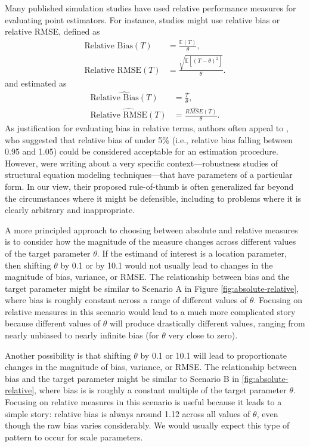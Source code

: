 \documentclass[
]{book}
\newcommand{\E}{\mathbb{E}}
\newcommand{\Bias}{\text{Bias}}
\newcommand{\RMSE}{\text{RMSE}}
\begin{document}
Many published simulation studies have used relative performance measures for evaluating point estimators. For instance, studies might use relative bias or relative RMSE, defined as
\[
\begin{aligned}
\text{Relative }\Bias(T) &= \frac{\E(T)}{\theta}, \\ 
\text{Relative }\RMSE(T) &= \frac{\sqrt{\E\left[\left(T - \theta\right)^2 \right]}}{\theta}.
\end{aligned}
\label{eq:relative-bias-RMSE}
\]
and estimated as
\[
\begin{aligned}
\widehat{\text{Relative }\Bias(T)} &= \frac{\bar{T}}{\theta}, \\ 
\widehat{\text{Relative }\RMSE(T)} &= \frac{\widehat{RMSE}(T)}{\theta}.
\end{aligned}
\label{eq:relative-bias-RMSE-estimators}
\]
As justification for evaluating bias in relative terms, authors often appeal to \citet{hoogland1998RobustnessStudiesCovariance}, who suggested that relative bias of under 5\% (i.e., relative bias falling between 0.95 and 1.05) could be considered acceptable for an estimation procedure.
However, \citet{hoogland1998RobustnessStudiesCovariance} were writing about a very specific context---robustness studies of structural equation modeling techniques---that have parameters of a particular form.
In our view, their proposed rule-of-thumb is often generalized far beyond the circumstances where it might be defensible, including to problems where it is clearly arbitrary and inappropriate.

A more principled approach to choosing between absolute and relative measures is to consider how the magnitude of the measure changes across different values of the target parameter \(\theta\).
If the estimand of interest is a location parameter, then shifting \(\theta\) by 0.1 or by 10.1 would not usually lead to changes in the magnitude of bias, variance, or RMSE.
The relationship between bias and the target parameter might be similar to Scenario A in Figure \ref{fig:absolute-relative}, where bias is roughly constant across a range of different values of \(\theta\).
Focusing on relative measures in this scenario would lead to a much more complicated story because different values of \(\theta\) will produce drastically different values, ranging from nearly unbiased to nearly infinite bias (for \(\theta\) very close to zero).

Another possibility is that shifting \(\theta\) by 0.1 or 10.1 will lead to proportionate changes in the magnitude of bias, variance, or RMSE.
The relationship between bias and the target parameter might be similar to Scenario B in \ref{fig:absolute-relative}, where bias is is roughly a constant multiple of the target parameter \(\theta\).
Focusing on relative measures in this scenario is useful because it leads to a simple story: relative bias is always around 1.12 across all values of \(\theta\), even though the raw bias varies considerably.
We would usually expect this type of pattern to occur for scale parameters.
\end{document}
